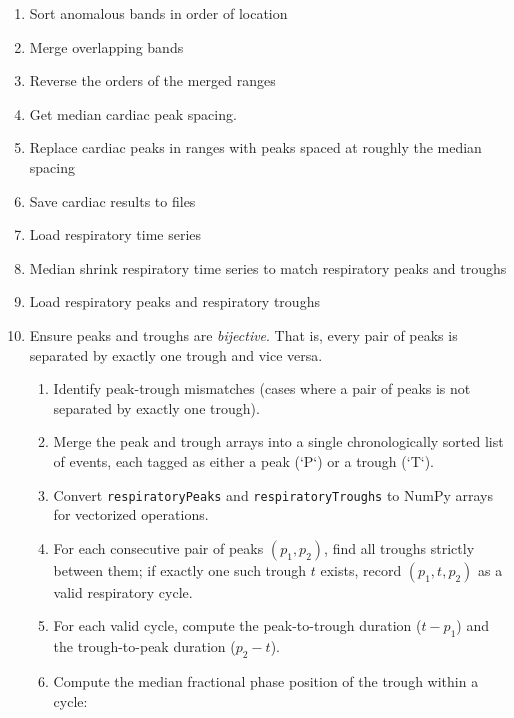 \documentclass[twoside,twocolumn]{article}
\begin{document}
\begin{enumerate}
\begin{enumerate}
\begin{enumerate}
		\end{enumerate}
		\item Lower bound, $b_l$, is $q1 - (k_{opt} \times IQR)$.
		\item Vectors with weight sums less than the lower bound are low end outliers.
		\item If there are low end outliers, rank their indices.
		\item Get outlier time series indices
		\item Find peak outliers
	\end{enumerate}
	\item Sort anomalous bands in  order of location
	\item Merge overlapping bands
	\item Reverse the orders of the merged ranges
	\item Get median cardiac peak spacing.
	\item Replace cardiac peaks in ranges with peaks spaced at roughly the median spacing
	\item Save cardiac results to files
	\item Load respiratory time series
	\item Median shrink respiratory time series to match respiratory peaks and troughs
	\item Load respiratory peaks and respiratory troughs
	\item Ensure peaks and troughs are {\em bijective}.  That is, every pair of peaks is separated by exactly one trough and vice versa.
	\begin{enumerate}
		\item Identify peak-trough mismatches (cases where a pair of peaks is not separated by exactly one trough).
		\item Merge the peak and trough arrays into a single chronologically sorted list of events, each tagged as either a peak (`P`) or a trough (`T`).
		\item Convert \texttt{respiratoryPeaks} and \texttt{respiratoryTroughs} to NumPy arrays for vectorized operations.
		\item For each consecutive pair of peaks $(p_1, p_2)$, find all troughs strictly between them; if exactly one such trough $t$ exists, record $(p_1, t, p_2)$ as a valid respiratory cycle.
		\item For each valid cycle, compute the peak-to-trough duration ($t - p_1$) and the trough-to-peak duration ($p_2 - t$).
		\item Compute the median fractional phase position of the trough within a cycle:

\end{enumerate}
\end{enumerate}
\end{document}
